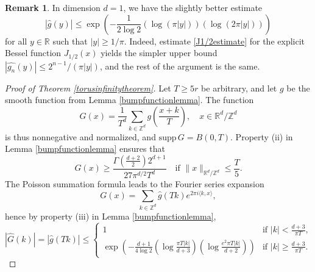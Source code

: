 \documentclass[11pt,a4paper]{article}
\theoremstyle{definition}
\newtheorem{remark}{Remark}
\begin{document}
\begin{remark}\label{1dimremark} In dimension $d=1$, we have the slightly better estimate
\[ |\widehat{g}(y)| \le \exp \left( - \frac{1}{2 \log 2} \left( \log (\pi |y|) \right) \left( \log (2 \pi |y|) \right) \right) \]
for all $y \in \mathbb{R}$ such that $|y| \ge 1/\pi$. Indeed, estimate \eqref{J1/2estimate} for the explicit Bessel function $J_{1/2}(x)$ yields the simpler upper bound $|\widehat{g_n}(y)| \le 2^{n-1}/(\pi |y|)$, and the rest of the argument is the same.
\end{remark}

\begin{proof}[Proof of Theorem \ref{torusinfinitytheorem}] Let $T \ge 5r$ be arbitrary, and let $g$ be the smooth function from Lemma \ref{bumpfunctionlemma}. The function
\[ G(x) = \frac{1}{T^d} \sum_{k \in \mathbb{Z}^d} g \left( \frac{x+k}{T} \right) , \quad x \in \mathbb{R}^d / \mathbb{Z}^d \]
is thus nonnegative and normalized, and $\mathrm{supp} \, G = B(0,T)$. Property (ii) in Lemma \ref{bumpfunctionlemma} ensures that
\begin{equation}\label{Glowerbound}
G(x) \ge \frac{\Gamma \left( \frac{d+2}{2} \right) 2^{d+1}}{27 \pi^{d/2} T^d} \quad \textrm{if } \| x \|_{\mathbb{R}^d / \mathbb{Z}^d} \le \frac{T}{5} .
\end{equation}
The Poisson summation formula leads to the Fourier series expansion
\[ G(x) = \sum_{k \in \mathbb{Z}^d} \widehat{g}(T k) e^{2 \pi i \langle k,x \rangle} , \]
hence by property (iii) in Lemma \ref{bumpfunctionlemma},
\begin{equation}\label{Ghatupperbound}
|\widehat{G}(k)| = |\widehat{g}(Tk)| \le  \left\{ \begin{array}{ll} 1 & \textrm{if } |k| < \frac{d+3}{\pi T}, \\ \exp \left( - \frac{d+1}{4 \log 2} \left( \log \frac{\pi T |k|}{d+3} \right) \left( \log \frac{e^2 \pi T |k|}{d+2} \right) \right) & \textrm{if } |k| \ge \frac{d+3}{\pi T} . \end{array} \right.
\end{equation}


\end{proof}
\end{document}
